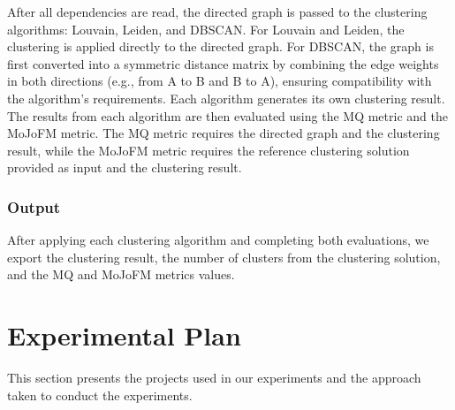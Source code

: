 \documentclass{ieeeaccess}
\begin{document}
After all dependencies are read, the directed graph is passed to the clustering algorithms: Louvain, Leiden, and DBSCAN. For Louvain and Leiden, the clustering is applied directly to the directed graph. For DBSCAN, the graph is first converted into a symmetric distance matrix by combining the edge weights in both directions (e.g., from A to B and B to A), ensuring compatibility with the algorithm’s requirements. Each algorithm generates its own clustering result. The results from each algorithm are then evaluated using the MQ metric and the MoJoFM metric. The MQ metric requires the directed graph and the clustering result, while the MoJoFM metric requires the reference clustering solution provided as input and the clustering result.


\subsubsection{Output}

After applying each clustering algorithm and completing both evaluations, we export the clustering result, the number of clusters from the clustering solution, and the MQ and MoJoFM metrics values.



\section{Experimental Plan}
\label{sec:plan}

This section presents the projects used in our experiments and the approach taken to conduct the experiments.
\end{document}

